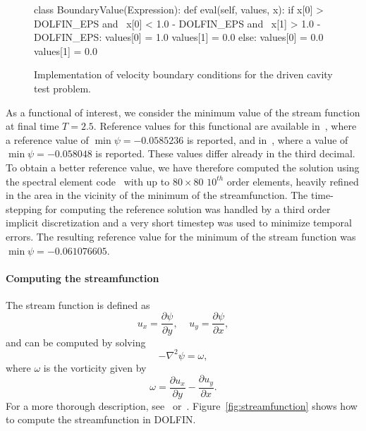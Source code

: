 \begin{figure}[htbp]
  \begin{center}
    \begin{python}
class BoundaryValue(Expression):
    def eval(self, values, x):
        if x[0] > DOLFIN_EPS and \
           x[0] < 1.0 - DOLFIN_EPS and \
           x[1] > 1.0 - DOLFIN_EPS:
            values[0] = 1.0
            values[1] = 0.0
        else:
            values[0] = 0.0
            values[1] = 0.0
    \end{python}
    \caption{Implementation of velocity boundary conditions for the
      driven cavity test problem.}
    \label{fig:bc_drivencavity}
  \end{center}
\end{figure}

As a functional of interest, we consider the minimum value of the
stream function at final time $T = 2.5$. Reference values for this
functional are available in~\cite{PanditKalitaDalal2007}, where a reference
value of $\min\psi = -0.0585236$ is reported, and
in~\cite{ChudanovPopkovChurbanovEtAl2007}, where a value of $\min\psi = -0.058048$ is
reported. These values differ already in the third decimal. To obtain
a better reference value, we have therefore computed the solution
using the spectral element code~\cite{Semtex} with up to $80 \times
80$ $10^{th}$ order elements, heavily refined in the area in the
vicinity of the minimum of the streamfunction. The time-stepping for
computing the reference solution was handled by a third order implicit
discretization and a very short timestep was used to minimize temporal
errors. The resulting reference value for the minimum of the stream
function was $\min\psi =-0.061076605$.

\paragraph{Computing the streamfunction}

The stream function is defined as
\begin{equation} \nonumber
  u_x = \frac{\partial{\psi}}{\partial{y}}, \;\; \;\;  u_y = \frac{\partial{\psi}}{\partial{x}},
\end{equation}
and can be computed by solving
\begin{equation} \nonumber
  -\nabla^2 \psi = \omega,
 \end{equation}
where $\omega$ is the vorticity given by
\begin{equation} \nonumber
  \omega = \frac{\partial{u_x}}{\partial{y}} - \frac{\partial{u_y}}{\partial{x}}.
\end{equation}
For a more thorough description, see~\cite{White1999} or~\cite{White1991}.
Figure~\ref{fig:streamfunction} shows how to compute the
streamfunction in DOLFIN.

